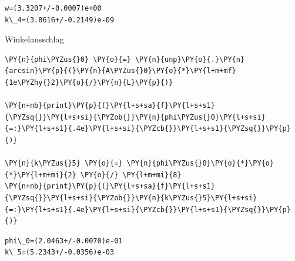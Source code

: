     \begin{Verbatim}[commandchars=\\\{\}]
w=(3.3207+/-0.0007)e+00
k\_4=(3.8616+/-0.2149)e-09
    \end{Verbatim}

    Winkelausschlag

    \begin{tcolorbox}[breakable, size=fbox, boxrule=1pt, pad at break*=1mm,colback=cellbackground, colframe=cellborder]
\begin{Verbatim}[commandchars=\\\{\}]
\PY{n}{phi\PYZus{}0} \PY{o}{=} \PY{n}{unp}\PY{o}{.}\PY{n}{arcsin}\PY{p}{(}\PY{n}{A\PYZus{}0}\PY{o}{*}\PY{l+m+mf}{1e\PYZhy{}2}\PY{o}{/}\PY{n}{L}\PY{p}{)}

\PY{n+nb}{print}\PY{p}{(}\PY{l+s+sa}{f}\PY{l+s+s1}{\PYZsq{}}\PY{l+s+si}{\PYZob{}}\PY{n}{phi\PYZus{}0}\PY{l+s+si}{=:}\PY{l+s+s1}{.4e}\PY{l+s+si}{\PYZcb{}}\PY{l+s+s1}{\PYZsq{}}\PY{p}{)}

\PY{n}{k\PYZus{}5} \PY{o}{=} \PY{n}{phi\PYZus{}0}\PY{o}{*}\PY{o}{*}\PY{l+m+mi}{2} \PY{o}{/} \PY{l+m+mi}{8}
\PY{n+nb}{print}\PY{p}{(}\PY{l+s+sa}{f}\PY{l+s+s1}{\PYZsq{}}\PY{l+s+si}{\PYZob{}}\PY{n}{k\PYZus{}5}\PY{l+s+si}{=:}\PY{l+s+s1}{.4e}\PY{l+s+si}{\PYZcb{}}\PY{l+s+s1}{\PYZsq{}}\PY{p}{)}
\end{Verbatim}
\end{tcolorbox}

    \begin{Verbatim}[commandchars=\\\{\}]
phi\_0=(2.0463+/-0.0070)e-01
k\_5=(5.2343+/-0.0356)e-03
    \end{Verbatim}

